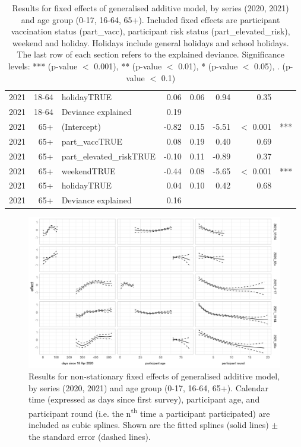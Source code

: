 \documentclass[fleqn,10pt]{wlscirep}
\begin{document}
\begin{table}[ht]
\begin{tabular}{rrlrrrrl}
  2021 & 18-64 & holidayTRUE & 0.06 & 0.06 & 0.94 & 0.35 &  \\ 
  2021 & 18-64 & Deviance explained & 0.19 &  &  &  &  \\ 
  \hline
  2021 & 65+ & (Intercept) & -0.82 & 0.15 & -5.51 & $<$ 0.001 & *** \\ 
  2021 & 65+ & part\_vaccTRUE & 0.08 & 0.19 & 0.40 & 0.69 &  \\ 
  2021 & 65+ & part\_elevated\_riskTRUE & -0.10 & 0.11 & -0.89 & 0.37 &  \\ 
  2021 & 65+ & weekendTRUE & -0.44 & 0.08 & -5.65 & $<$ 0.001 & *** \\ 
  2021 & 65+ & holidayTRUE & 0.04 & 0.10 & 0.42 & 0.68 &  \\ 
  2021 & 65+ & Deviance explained & 0.16 &  &  &  &  \\ 
   \hline
\end{tabular}
\caption{\label{tab:fixed_effects}Results for fixed effects of generalised additive model, by series (2020, 2021) and age group (0-17, 16-64, 65+). Included fixed effects are participant vaccination status (part\_vacc), participant risk status (part\_elevated\_risk), weekend and holiday. Holidays include general holidays and school holidays. The last row of each section refers to the explained deviance.
Significance levels: *** (p-value $<$ 0.001), ** (p-value $<$ 0.01), * (p-value $<$ 0.05), . (p-value $<$ 0.1) } 
\end{table}


\begin{figure}[ht]
\centering
\includegraphics[width=\linewidth]{../figures/results_splines.png}
\caption{Results for non-stationary fixed effects of generalised additive model, by series (2020, 2021) and age group (0-17, 16-64, 65+). Calendar time (expressed as days since first survey), participant age, and participant round (i.e. the n\textsuperscript{th} time a participant participated) are included as cubic splines. Shown are the fitted splines (solid lines) $\pm$ the standard error (dashed lines).}
\label{fig:splines}
\end{figure}
\end{document}
